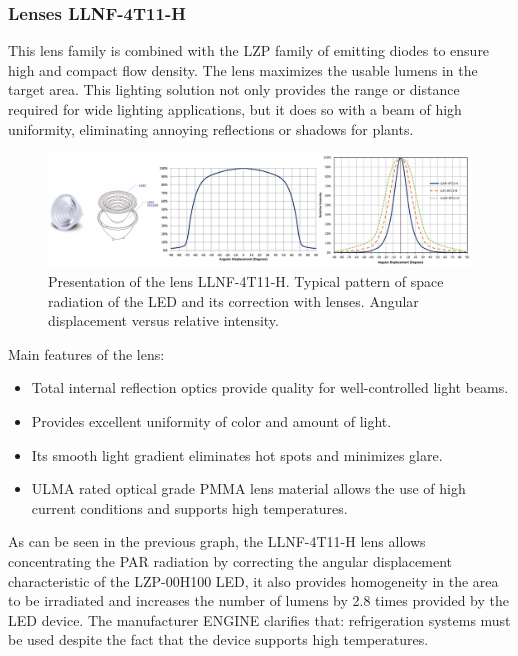 \documentclass[letterpaper,12pt,twoside]{articleingud}
\begin{document}
\subsubsection{Lenses LLNF-4T11-H}
This lens family is combined with the LZP family of emitting diodes to ensure high and compact flow density. The lens maximizes the usable lumens in the target area. This lighting solution not only provides the range or distance required for wide lighting applications, but it does so with a beam of high uniformity, eliminating annoying reflections or shadows for plants. 
\begin{figure}
 \begin{center}
  \includegraphics[width=16cm]{images/lente.png}
   \caption{Presentation of the lens LLNF-4T11-H. Typical pattern of space radiation of the LED and its correction with lenses. Angular displacement versus relative intensity.\cite{ledEngine} }
  \end{center}
\end{figure}
Main features of the lens:
\begin{itemize}
    \item Total internal reflection optics provide quality for well-controlled light beams.
    \item Provides excellent uniformity of color and amount of light.
    \item Its smooth light gradient eliminates hot spots and minimizes glare.
    \item ULMA rated optical grade PMMA lens material allows the use of high current conditions and supports high temperatures.
\end{itemize}
As can be seen in the previous graph, the LLNF-4T11-H lens allows concentrating the PAR radiation by correcting the angular displacement characteristic of the LZP-00H100 LED, it also provides homogeneity in the area to be irradiated and increases the number of lumens by 2.8 times provided by the LED device. The manufacturer ENGINE clarifies that: refrigeration systems must be used despite the fact that the device supports high temperatures.
\end{document}
